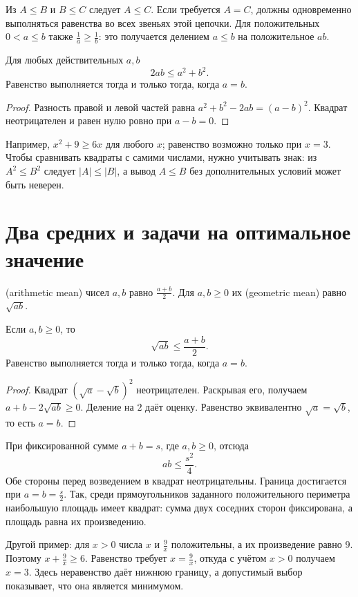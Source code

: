 Из \(A\le B\) и \(B\le C\) следует \(A\le C\). Если требуется \(A=C\), должны одновременно выполняться равенства во всех звеньях этой цепочки. Для положительных \(0<a\le b\) также \(\frac1a\ge\frac1b\): это получается делением \(a\le b\) на положительное \(ab\).

\begin{theorem}\label{thm:legacy-c17-1}
Для любых действительных \(a,b\)
\[
2ab\le a^2+b^2.
\]
Равенство выполняется тогда и только тогда, когда \(a=b\).
\end{theorem}
\begin{proof}
Разность правой и левой частей равна \(a^2+b^2-2ab=(a-b)^2\). Квадрат неотрицателен и равен нулю ровно при \(a-b=0\).
\end{proof}
Например, \(x^2+9\ge6x\) для любого \(x\); равенство возможно только при \(x=3\). Чтобы сравнивать квадраты с самими числами, нужно учитывать знак: из \(A^2\le B^2\) следует \(|A|\le|B|\), а вывод \(A\le B\) без дополнительных условий может быть неверен.

\section{Два средних и задачи на оптимальное значение}
\begin{definition}
 (arithmetic mean) чисел \(a,b\) равно \(\frac{a+b}{2}\). Для \(a,b\ge0\) их  (geometric mean) равно \(\sqrt{ab}\).
\end{definition}
\begin{theorem}\label{thm:legacy-c17-2}
Если \(a,b\ge0\), то
\[
\sqrt{ab}\le\frac{a+b}{2}.
\]
Равенство выполняется тогда и только тогда, когда \(a=b\).
\end{theorem}
\begin{proof}
Квадрат \((\sqrt a-\sqrt b)^2\) неотрицателен. Раскрывая его, получаем \(a+b-2\sqrt{ab}\ge0\). Деление на \(2\) даёт оценку. Равенство эквивалентно \(\sqrt a=\sqrt b\), то есть \(a=b\).
\end{proof}
При фиксированной сумме \(a+b=s\), где \(a,b\ge0\), отсюда
\[
ab\le\frac{s^2}{4}.
\]
Обе стороны перед возведением в квадрат неотрицательны. Граница достигается при \(a=b=\frac s2\). Так, среди прямоугольников заданного положительного периметра наибольшую площадь имеет квадрат: сумма двух соседних сторон фиксирована, а площадь равна их произведению.

Другой пример: для \(x>0\) числа \(x\) и \(\frac9x\) положительны, а их произведение равно \(9\). Поэтому \(x+\frac9x\ge6\). Равенство требует \(x=\frac9x\), откуда с учётом \(x>0\) получаем \(x=3\). Здесь неравенство даёт нижнюю границу, а допустимый выбор показывает, что она является минимумом.

